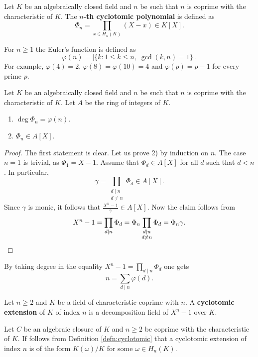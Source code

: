 \begin{definition}
    Let $K$ be an algebraically closed field and $n$ be
    such that $n$ is coprime with the characteristic of $K$. The \textbf{$n$-th cyclotomic
    polynomial} is defined as 
    \[
    \Phi_n=\prod_{x\in H_n(K)}(X-x)\in K[X].
    \]
\end{definition}

For $n\geq1$ the Euler's function is defined as 
\[
\varphi(n)=|\{k:1\leq k\leq n,\;\gcd(k,n)=1\}|.
\]
For example, $\varphi(4)=2$, $\varphi(8)=\varphi(10)=4$ and $\varphi(p)=p-1$ for every prime $p$. 

\begin{proposition}
    Let $K$ be an algebraically closed field and $n$ be
    such that $n$ is coprime with the characteristic of $K$. Let $A$ be
    the ring of integers of $K$. 
    \begin{enumerate}
        \item $\deg\Phi_n=\varphi(n)$.
        \item $\Phi_n\in A[X]$.
    \end{enumerate}
\end{proposition}

\begin{proof}
    The first statement is clear. Let us prove 2) by induction on $n$. The case $n=1$ is
    trivial, as $\Phi_1=X-1$. Assume that $\Phi_d\in A[X]$ for all $d$ such that $d<n$. 
    In particular,
    \[
    \gamma=\prod_{\substack{d\mid n\\d\ne n}}\Phi_d\in A[X].
    \]
    Since $\gamma$ is monic, it follows that 
    $\frac{X^n-1}{\gamma}\in A[X]$. Now the claim follows from 
    \[
    X^n-1=\prod_{d\mid n}\Phi_d=\Phi_n\prod_{\substack{d\mid n\\d\ne n}}\Phi_d=\Phi_n\gamma.\qedhere
    \]
\end{proof}

By taking degree in the equality 
$X^n-1=\prod_{d\mid n}\Phi_d$ 
one gets 
\[
n=\sum_{d\mid n}\varphi(d).
\]

\begin{definition}
\label{defn:cyclotomic}
    Let $n\geq2$ and $K$ be a field of characteristic coprime with $n$. A 
    \textbf{cyclotomic extension} of $K$ of index $n$ is a 
    decomposition field of $X^n-1$ over $K$. 
\end{definition}

Let $C$ be an algebraic closure of $K$ and $n\geq2$ be coprime with the characteristic of $K$. 
If follows from Definition \ref{defn:cyclotomic} 
that a cyclotomic extension of index $n$ is of the form 
$K(\omega)/K$ for some $\omega\in H_n(K)$. 

